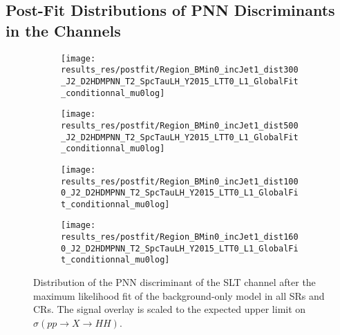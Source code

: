 \subsection{Post-Fit Distributions of PNN Discriminants in the \lephad
  Channels}%
\label{app:pnn_plots_lephad}

\begin{figure}[htbp]
  \centering

  \begin{subfigure}{0.495\textwidth}
    \centering

    \texttt{[image: results\_res/postfit/Region\_BMin0\_incJet1\_dist300\_J2\_D2HDMPNN\_T2\_SpcTauLH\_Y2015\_LTT0\_L1\_GlobalFit\_conditionnal\_mu0log]}
  \end{subfigure}\hfill%
  \begin{subfigure}{0.495\textwidth}
    \centering

    \texttt{[image: results\_res/postfit/Region\_BMin0\_incJet1\_dist500\_J2\_D2HDMPNN\_T2\_SpcTauLH\_Y2015\_LTT0\_L1\_GlobalFit\_conditionnal\_mu0log]}
  \end{subfigure}

  \begin{subfigure}{0.495\textwidth}
    \centering

    \texttt{[image: results\_res/postfit/Region\_BMin0\_incJet1\_dist1000\_J2\_D2HDMPNN\_T2\_SpcTauLH\_Y2015\_LTT0\_L1\_GlobalFit\_conditionnal\_mu0log]}
  \end{subfigure}\hfill%
  \begin{subfigure}{0.495\textwidth}
    \centering

    \texttt{[image: results\_res/postfit/Region\_BMin0\_incJet1\_dist1600\_J2\_D2HDMPNN\_T2\_SpcTauLH\_Y2015\_LTT0\_L1\_GlobalFit\_conditionnal\_mu0log]}
  \end{subfigure}

  \caption{Distribution of the PNN discriminant of the \lephad SLT channel after
    the maximum likelihood fit of the background-only model in all SRs and
    CRs. The signal overlay is scaled to the expected upper limit on
    $\sigma(pp \to X \to HH)$.}
\end{figure}


